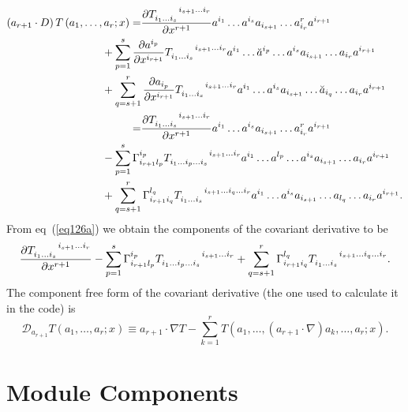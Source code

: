\documentclass[12pt,twoside,openright]{memoir}
\newcommand{\bfrac}[2]{\displaystyle\frac{#1}{#2}}
\newcommand{\lp}{\left (}
\newcommand{\rp}{\right )}
\newcommand{\pdiff}[2]{\bfrac{\partial {#1}}{\partial {#2}}}
\newcommand{\f}[2]{{#1}\lp {#2} \rp}
\newcommand{\paren}[1]{\lp {#1} \rp}
\begin{document}
\begin{align}
	\paren{a_{r+1}\cdot D} \f{T}{a_{1},\dots,a_{r};x} =& 
		\pdiff{T\indices{_{i_{1}\dots i_{s}}^{i_{s+1}\dots i_{r}}}}{x^{r+1}}a^{i_{1}}\dots a^{i_{s}}a_{i_{s+1}}\dots a^{r}_{i_{r}}
		a^{i_{r+1}} \nonumber \\
		&\hspace{-0.5in}+ \sum_{p=1}^{s}\pdiff{a^{i_{p}}}{x^{i_{r+1}}}T\indices{_{i_{1}\dots i_{s}}^{i_{s+1}\dots i_{r}}}a^{i_{1}}\dots
		\breve{a}^{i_{p}}\dots a^{i_{s}}a_{i_{s+1}}\dots a_{i_{r}}a^{i_{r+1}} \nonumber \\
		&\hspace{-0.5in}+ \sum_{q=s+1}^{r}\pdiff{a_{i_{p}}}{x^{i_{r+1}}}T\indices{_{i_{1}\dots i_{s}}^{i_{s+1}\dots i_{r}}}a^{i_{1}}\dots
		a^{i_{s}}a_{i_{s+1}}\dots\breve{a}_{i_{q}}\dots a_{i_{r}}a^{i_{r+1}} \nonumber \\
		=& \pdiff{T\indices{_{i_{1}\dots i_{s}}^{i_{s+1}\dots i_{r}}}}{x^{r+1}}a^{i_{1}}\dots a^{i_{s}}a_{i_{s+1}}\dots a^{r}_{i_{r}}
		a^{i_{r+1}} \nonumber \\
		&\hspace{-0.5in}- \sum_{p=1}^{s}\Gamma_{i_{r+1}l_{p}}^{i_{p}}T\indices{_{i_{1}\dots i_{p}\dots i_{s}}^{i_{s+1}
		\dots i_{r}}}a^{i_{1}}\dots
		a^{l_{p}}\dots a^{i_{s}}a_{i_{s+1}}\dots a_{i_{r}}a^{i_{r+1}} \nonumber \\
		&\hspace{-0.5in}+ \sum_{q=s+1}^{r}\Gamma_{i_{r+1}i_{q}}^{l_{q}}T\indices{_{i_{1}\dots i_{s}}^{i_{s+1}\dots i_{q}
		\dots i_{r}}}a^{i_{1}}\dots
		a^{i_{s}}a_{i_{s+1}}\dots a_{l_{q}}\dots a_{i_{r}}a^{i_{r+1}}	.	\label{eq126a}
\end{align}
From eq~(\ref{eq126a}) we obtain the components of the covariant derivative to be
\begin{align}
	\pdiff{T\indices{_{i_{1}\dots i_{s}}^{i_{s+1}\dots i_{r}}}}{x^{r+1}}
	- \sum_{p=1}^{s}\Gamma_{i_{r+1}l_{p}}^{i_{p}}T\indices{_{i_{1}\dots i_{p}\dots i_{s}}^{i_{s+1}\dots i_{r}}}
	+ \sum_{q=s+1}^{r}\Gamma_{i_{r+1}i_{q}}^{l_{q}}T\indices{_{i_{1}\dots i_{s}}^{i_{s+1}\dots i_{q}\dots i_{r}}}.
\end{align}
The component free form of the covariant derivative (the one used to calculate it in the code) is
\begin{equation}
	\mathcal{D}_{a_{r+1}} \f{T}{a_{1},\dots,a_{r};x} \equiv a_{r+1}\cdot\nabla T 
		- \sum_{k=1}^{r}\f{T}{a_{1},\dots,\paren{a_{r+1}\cdot\nabla} a_{k},\dots,a_{r};x}.
\end{equation}

\chapter{Module Components}
\end{document}
